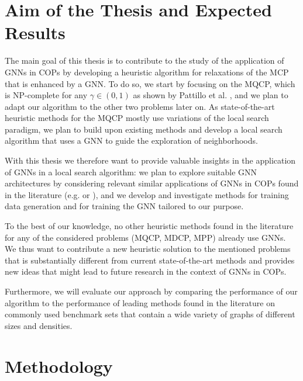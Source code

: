 \documentclass[11pt]{article}
\begin{document}
\section{Aim of the Thesis and Expected Results}
The main goal of this thesis is to contribute to the study of the application of GNNs in COPs by developing a heuristic algorithm for relaxations of the MCP that is enhanced by a GNN. To do so, we start by focusing on the MQCP, which is NP-complete for any $\gamma \in (0,1)$ as shown by Pattillo et al. \cite{pattillo_maximum_2013}, and we plan to adapt our algorithm to the other two problems later on. 
As state-of-the-art heuristic methods for the MQCP mostly use variations of the local search paradigm, we plan to build upon existing methods and develop a local search algorithm that uses a GNN to guide the exploration of neighborhoods. 

With this thesis we therefore want to provide valuable insights in the application of GNNs in a local search algorithm: we plan to explore suitable GNN architectures by considering relevant similar applications of GNNs in COPs found in the literature (e.g. \cite{Kool2019} or \cite{Hudson2021}), and we develop and investigate methods for training data generation and for training the GNN tailored to our purpose. 

To the best of our knowledge, no other heuristic methods found in the literature for any of the considered problems (MQCP, MDCP, MPP) already use GNNs. We thus want to contribute a new heuristic solution to the mentioned problems that is substantially different from current state-of-the-art methods and provides new ideas that might lead to future research in the context of GNNs in COPs. 

Furthermore, 
we will evaluate our approach by comparing the performance of our algorithm to the performance of leading methods found in the literature on commonly used benchmark sets that contain a wide variety of graphs of different sizes and densities. 

\section{Methodology}
\end{document}
